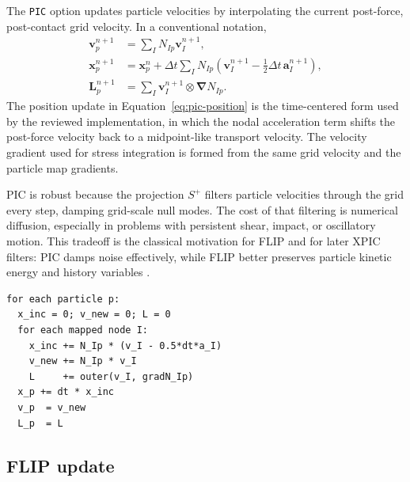 The \texttt{PIC} option updates particle velocities by interpolating the current post-force, post-contact grid velocity.  In a conventional notation,
\begin{align}
  \boldsymbol{v}^{n+1}_p
    &= \sum_I N_{Ip}\boldsymbol{v}^{n+1}_I,
  \label{eq:pic-velocity}\\
  \boldsymbol{x}^{n+1}_p
    &= \boldsymbol{x}^{n}_p
     +\Delta t\sum_I N_{Ip}\left(\boldsymbol{v}^{n+1}_I
       -\frac{1}{2}\Delta t\,\boldsymbol{a}^{n+1}_I\right),
  \label{eq:pic-position}\\
  \boldsymbol{L}^{n+1}_p
    &= \sum_I \boldsymbol{v}^{n+1}_I\otimes\boldsymbol{\nabla}N_{Ip}.
  \label{eq:pic-velocity-gradient}
\end{align}
The position update in Equation~\eqref{eq:pic-position} is the time-centered form used by the reviewed implementation, in which the nodal acceleration term shifts the post-force velocity back to a midpoint-like transport velocity.  The velocity gradient used for stress integration is formed from the same grid velocity and the particle map gradients.

PIC is robust because the projection $S^+$ filters particle velocities through the grid every step, damping grid-scale null modes.  The cost of that filtering is numerical diffusion, especially in problems with persistent shear, impact, or oscillatory motion.  This tradeoff is the classical motivation for FLIP and for later XPIC filters: PIC damps noise effectively, while FLIP better preserves particle kinetic energy and history variables \cite{sulsky1995solid,brackbill1988flip,hammerquist2017xpic}.

\begin{lstlisting}[caption={PIC grid-to-particle update.},basicstyle=\ttfamily\small]
for each particle p:
  x_inc = 0; v_new = 0; L = 0
  for each mapped node I:
    x_inc += N_Ip * (v_I - 0.5*dt*a_I)
    v_new += N_Ip * v_I
    L     += outer(v_I, gradN_Ip)
  x_p += dt * x_inc
  v_p  = v_new
  L_p  = L
\end{lstlisting}

\subsection{FLIP update}
\label{subsec:flip-update}

